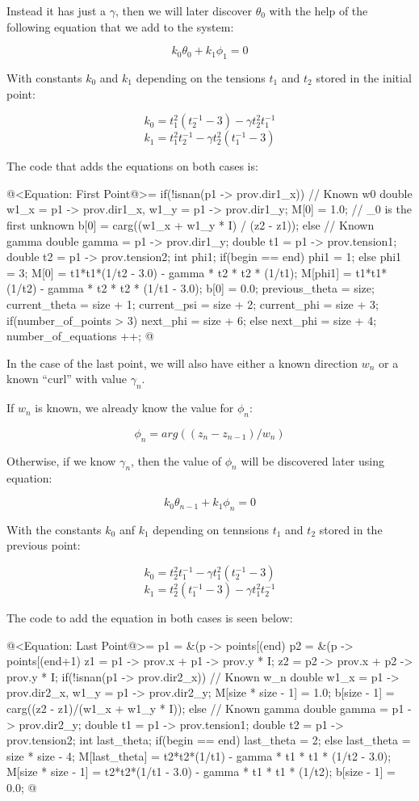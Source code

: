 Instead it has just a $\gamma$, then we will later discover $\theta_0$
with the help of the following equation that we add to the system:

$$
k_0\theta_0+k_1\phi_1=0
$$

With constants $k_0$ and $k_1$ depending on the tensions $t_1$ and
$t_2$ stored in the initial point:

$$
k_0=t_1^2(t_2^{-1}-3)-\gamma t_2^2t_1^{-1}
$$
$$
k_1=t_1^2t_2^{-1}-\gamma t_2^2(t_1^{-1}-3)
$$

The code that adds the equations on both cases is:

\iniciocodigo
@<Equation: First Point@>=
if(!isnan(p1 -> prov.dir1_x)){ // Known w0
  double w1_x = p1 -> prov.dir1_x, w1_y = p1 -> prov.dir1_y;
  M[0] = 1.0; // \theta_0 is the first unknown
  b[0] = carg((w1_x + w1_y * I) / (z2 - z1));
}
else{ // Known gamma
  double gamma = p1 -> prov.dir1_y;
  double t1 = p1 -> prov.tension1;
  double t2 = p1 -> prov.tension2;
  int phi1;
  if(begin == end)
    phi1 = 1;
  else
    phi1 = 3;
  M[0] = t1*t1*(1/t2 - 3.0) - gamma * t2 * t2 * (1/t1);
  M[phi1] = t1*t1*(1/t2) - gamma * t2 * t2 * (1/t1 - 3.0);
  b[0] = 0.0;
}
{
  previous_theta = size;
  current_theta = size + 1;
  current_psi = size + 2;
  current_phi = size + 3;
  if(number_of_points > 3)
    next_phi = size + 6;
  else
    next_phi = size + 4;
  number_of_equations ++;
}
@
\fimcodigo

In the case of the last point, we will also have either a known
direction $w_n$ or a known ``curl'' with value $\gamma_n$.

If $w_n$ is known, we already know the value for $\phi_n$:

$$
\phi_n = arg((z_n - z_{n-1})/w_n)
$$

Otherwise, if we know $\gamma_n$, then the value of $\phi_n$ will be
discovered later using equation:

$$
k_0\theta_{n-1}+k_1\phi_{n}=0
$$

With the constants $k_0$ anf $k_1$ depending on tennsions $t_1$ and
$t_2$ stored in the previous point:

$$
k_0=t_2^2t_1^{-1}-\gamma t_1^2(t_2^{-1}-3)
$$
$$
k_1=t_2^2(t_1^{-1}-3)-\gamma t_1^2t_2^{-1}
$$

The code to add the equation in both cases is seen below:

\iniciocodigo
@<Equation: Last Point@>=
p1 = &(p -> points[(end) %
p2 = &(p -> points[(end+1) %
z1 = p1 -> prov.x + p1 -> prov.y * I;
z2 = p2 -> prov.x + p2 -> prov.y * I;
if(!isnan(p1 -> prov.dir2_x)){ // Known w_n 
  double w1_x = p1 -> prov.dir2_x, w1_y = p1 -> prov.dir2_y;
  M[size * size - 1] = 1.0;
  b[size - 1] = carg((z2 - z1)/(w1_x + w1_y * I));
}
else{ // Known gamma
  double gamma = p1 -> prov.dir2_y;
  double t1 = p1 -> prov.tension1;
  double t2 = p1 -> prov.tension2;
  int last_theta;
  if(begin == end)
    last_theta = 2;
  else
    last_theta = size * size - 4;
  M[last_theta] = t2*t2*(1/t1) - gamma * t1 * t1 * (1/t2 - 3.0);
  M[size * size - 1] = t2*t2*(1/t1 - 3.0) - gamma * t1 * t1 * (1/t2);
  b[size - 1] = 0.0;
}
@
\fimcodigo

